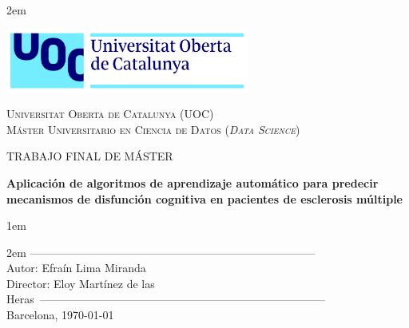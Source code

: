\newpage
\thispagestyle{empty}

\baselineskip 2em


\centerline {\includegraphics[width=0.6\textwidth]{figs/UOC-logo}}
\begin{center}
\textsc{Universitat Oberta de Catalunya (UOC) \\
 Máster Universitario en Ciencia de Datos (\textit{Data Science})\\}


\vspace*{1.5cm}

\textsc{\Large TRABAJO FINAL DE MÁSTER}



\vspace*{1.5cm}

\textbf{\Large Aplicación de algoritmos de aprendizaje automático para predecir mecanismos de disfunción cognitiva en pacientes de esclerosis múltiple}


\vspace{2.5cm}
\baselineskip 1em

\vspace{1cm}
\baselineskip 2em
-----------------------------------------------------------------------------\\
Autor:      Efraín Lima Miranda\\
Director:   Eloy Martínez de las Heras\
-----------------------------------------------------------------------------\\
\vspace*{1.5cm}
Barcelona, \today

\end{center}

\newpage
\pagestyle{empty}
\hfill
